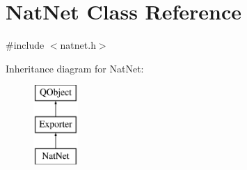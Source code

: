 \hypertarget{class_nat_net}{\section{Nat\-Net Class Reference}
\label{class_nat_net}
}


{\ttfamily \#include $<$natnet.\-h$>$}

Inheritance diagram for Nat\-Net\-:\begin{figure}[H]
\begin{center}
\leavevmode
\includegraphics[height=3.000000cm]{class_nat_net}
\end{center}
\end{figure}
